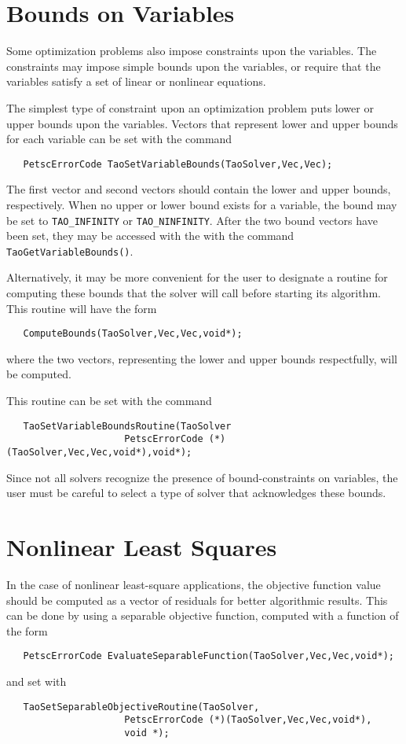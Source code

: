 \section{Bounds on Variables}\label{sec:bounds}

Some optimization problems also impose constraints upon the variables.
The constraints may impose simple bounds upon the variables, or
require that the variables satisfy a set of linear or  nonlinear equations.

The simplest type of constraint upon an optimization problem puts lower
or upper bounds upon the variables. 
Vectors that represent lower and upper bounds for each variable 
can be set with the command  
\begin{verbatim}
   PetscErrorCode TaoSetVariableBounds(TaoSolver,Vec,Vec);
\end{verbatim}
\noindent
The first vector and second vectors should contain the lower and upper 
bounds, respectively.
When no upper or lower bound exists for a variable, the bound
may be set to {\tt TAO\_INFINITY} or {\tt TAO\_NINFINITY}.
After the two bound vectors have been set, they may be accessed with the
with the command  {\tt TaoGetVariableBounds()}.

Alternatively, it may be more convenient for the user to designate a routine 
for computing these bounds
that the solver will call before starting its algorithm.  This routine will
have the form
\begin{verbatim}
   ComputeBounds(TaoSolver,Vec,Vec,void*);
\end{verbatim}
where the two vectors, representing the lower and upper bounds respectfully, 
will be computed.

This routine can be set with the command
\begin{verbatim}
   TaoSetVariableBoundsRoutine(TaoSolver
                     PetscErrorCode (*)(TaoSolver,Vec,Vec,void*),void*);
\end{verbatim}
   
Since not all solvers recognize the presence of bound-constraints on 
variables, the user must be careful 
to select a type of solver that acknowledges these bounds.

\section{Nonlinear Least Squares}
In the case of nonlinear least-square applications, the objective function
value should be computed as a vector of residuals for better algorithmic 
results.  This can be done by using a separable objective function, computed
with a function of the form
\begin{verbatim}
   PetscErrorCode EvaluateSeparableFunction(TaoSolver,Vec,Vec,void*);
\end{verbatim}
and set with
\begin{verbatim}
   TaoSetSeparableObjectiveRoutine(TaoSolver,
                     PetscErrorCode (*)(TaoSolver,Vec,Vec,void*),
                     void *);
\end{verbatim}


